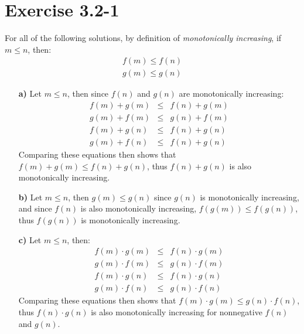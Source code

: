 \documentclass{article}
\begin{document}
\section*{Exercise 3.2-1}

For all of the following solutions, by definition of \textit{monotonically increasing}, if $m \leq n$, then:
\begin{eqnarray*}
	f(m) \leq f(n) \\
	g(m) \leq g(n)
\end{eqnarray*}

\begin{itemize}
\item[\textbf{a)}] Let $m \leq n$, then since $f(n)$ and $g(n)$ are monotonically increasing:
	\begin{eqnarray*}
		f(m) + g(m) & \leq & f(n) + g(m) \\
		g(m) + f(m) & \leq & g(n) + f(m) \\
		f(m) + g(n) & \leq & f(n) + g(n) \\
		g(m) + f(n) & \leq & f(n) + g(n)
	\end{eqnarray*}
	Comparing these equations then shows that $f(m) + g(m) \leq f(n) + g(n)$, thus $f(n) + g(n)$ is also monotonically increasing.
\item[\textbf{b)}] Let $m \leq n$, then $g(m) \leq g(n)$ since $g(n)$ is monotonically increasing, and since $f(n)$ is also monotonically increasing, $f(g(m)) \leq f(g(n))$, thus $f(g(n))$ is monotonically increasing.
\item[\textbf{c)}] Let $m \leq n$, then:
	\begin{eqnarray*}
		f(m) \cdot g(m) & \leq & f(n) \cdot g(m) \\
		g(m) \cdot f(m) & \leq & g(n) \cdot f(m) \\
		f(m) \cdot g(n) & \leq & f(n) \cdot g(n) \\
		g(m) \cdot f(n) & \leq & g(n) \cdot f(n)
	\end{eqnarray*}
	Comparing these equations then shows that $f(m) \cdot g(m) \leq g(n) \cdot f(n)$, thus $f(n) \cdot g(n)$ is also monotonically increasing for nonnegative $f(n)$ and $g(n)$.
\end{itemize}
\end{document}
